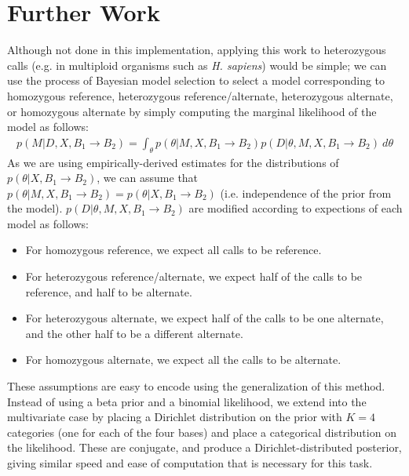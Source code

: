 \documentclass[10pt,letterpaper]{article}
\begin{document}
\section{Further Work}

\par Although not done in this implementation, applying this work to heterozygous calls (e.g. in multiploid organisms such as \textit{H. sapiens}) would be simple; we can use the process of Bayesian model selection
to select a model corresponding to homozygous reference, heterozygous reference/alternate, heterozygous alternate, or homozygous alternate by simply computing the marginal likelihood of the model as follows:
\begin{equation}
\begin{aligned}
 p (M | D, X, B_1 \rightarrow B_2) = \int_\theta p(\theta | M, X, B_1 \rightarrow B_2) p(D | \theta, M, X, B_1 \rightarrow B_2) \ d\theta
\end{aligned}
\end{equation}
As we are using empirically-derived estimates for the distributions of $p(\theta | X, B_1 \rightarrow B_2)$, we can assume that $p(\theta | M, X, B_1 \rightarrow B_2) = p(\theta | X, B_1 \rightarrow B_2)$
(i.e. independence of the prior from the model).
$p(D | \theta, M, X, B_1 \rightarrow B_2)$ are modified according to expections of each model as follows:
\begin{itemize}
    \item For homozygous reference, we expect all calls to be reference.
    \item For heterozygous reference/alternate, we expect half of the calls to be reference, and half to be alternate.
    \item For heterozygous alternate, we expect half of the calls to be one alternate, and the other half to be a different alternate.
    \item For homozygous alternate, we expect all the calls to be alternate.
\end{itemize}
These assumptions are easy to encode using the generalization of this method. Instead of using a beta prior and a binomial likelihood, we extend into the multivariate case by placing a Dirichlet distribution on the
prior with $K = 4$ categories (one for each of the four bases) and place a categorical distribution on the likelihood. These are conjugate, and produce a Dirichlet-distributed posterior, giving similar speed and ease
of computation that is necessary for this task.
\end{document}
